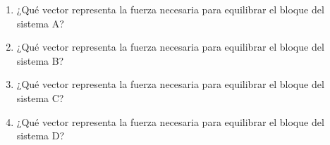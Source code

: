 \documentclass[11pt]{book}
\begin{document}
\begin{itemize}
\begin{boxK}
\begin{figure}[H]
          \end{figure}
          \begin{enumerate}
            \item ¿Qué vector representa la fuerza necesaria para equilibrar el bloque del sistema A?\\
            \item ¿Qué vector representa la fuerza necesaria para equilibrar el bloque del sistema B?\\
            \item ¿Qué vector representa la fuerza necesaria para equilibrar el bloque del sistema C?\\
            \item ¿Qué vector representa la fuerza necesaria para equilibrar el bloque del sistema D?\\
          \end{enumerate}
        \end{boxK}
\end{itemize}
\newpage
\end{document}

